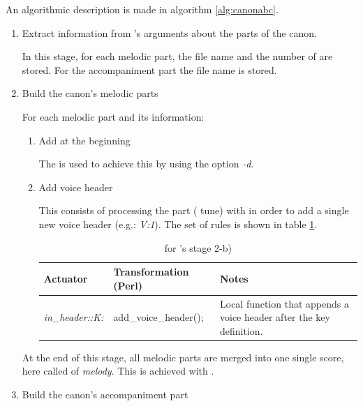 An algorithmic description is made in algorithm \ref{alg:canonabc}.\\

\begin{enumerate}
  \item Extract information from \canonabc{}'s arguments about the parts of the canon.

  In this stage, for each melodic part, the file name and the number of \measurerests{} are stored.
  For the accompaniment part the file name is stored.

  \item Build the canon's melodic parts

    For each melodic part and its information:
    \begin{enumerate}
      \item Add \measurerests{} at the beginning

      The \abcpt{} \catabc{} is used to achieve this by using the option \emph{-d}.

      \item Add voice header

      This consists of processing the part (\abc{} tune) with \dt{} in order to add a single new
      voice header (e.g.: \emph{V:1}). The set of \abcdt{} rules is shown in table
      \ref{tab:canon_add_voice_rules}.

      \begin{center}
        \begin{table}[h]
          \begin{tabular}{|p{2.5cm}|p{4.75cm}|p{8cm}|}
            \hline
            Actuator & Transformation (Perl) & Notes\\
            \hline
            \hline
            \emph{in\_header::K:} & add\_voice\_header(); & Local function that appends a voice header
            after the key definition.
            \\
            \hline
          \end{tabular}
          \caption{\abcdtrules{} for \canonabc{}'s stage 2-b)}
          \label{tab:canon_add_voice_rules}
        \end{table}
      \end{center}
    \end{enumerate}
    At the end of this stage, all melodic parts are merged into one single score, here called of
    \emph{melody}. This is achieved with \pasteabc{}.

  \item Build the canon's accompaniment part


\end{enumerate}

